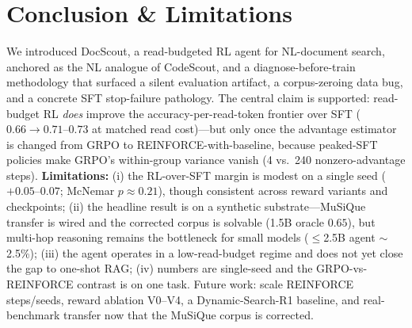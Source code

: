 \documentclass[10pt,twocolumn]{article}
\begin{document}
\section{Conclusion \& Limitations}
We introduced DocScout, a read-budgeted RL agent for NL-document search, anchored as the NL analogue of CodeScout, and a diagnose-before-train methodology that surfaced a silent evaluation artifact, a corpus-zeroing data bug, and a concrete SFT stop-failure pathology. The central claim is supported: read-budget RL \emph{does} improve the accuracy-per-read-token frontier over SFT ($0.66\!\to\!0.71$--$0.73$ at matched read cost)---but only once the advantage estimator is changed from GRPO to REINFORCE-with-baseline, because peaked-SFT policies make GRPO's within-group variance vanish (4 vs.\ 240 nonzero-advantage steps). \textbf{Limitations:} (i) the RL-over-SFT margin is modest on a single seed ($+0.05$--$0.07$; McNemar $p\!\approx\!0.21$), though consistent across reward variants and checkpoints; (ii) the headline result is on a synthetic substrate---MuSiQue transfer is wired and the corrected corpus is solvable (1.5B oracle $0.65$), but multi-hop reasoning remains the bottleneck for small models ($\leq$2.5B agent $\sim$2.5\%); (iii) the agent operates in a low-read-budget regime and does not yet close the gap to one-shot RAG; (iv) numbers are single-seed and the GRPO-vs-REINFORCE contrast is on one task. Future work: scale REINFORCE steps/seeds, reward ablation V0--V4, a Dynamic-Search-R1 baseline, and real-benchmark transfer now that the MuSiQue corpus is corrected.



\end{document}
